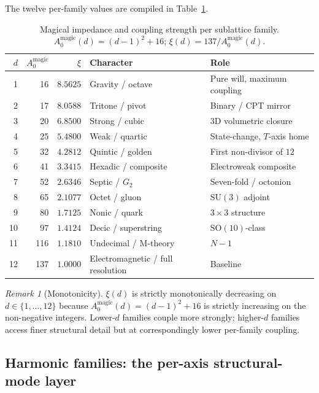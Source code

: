 \documentclass[11pt,a4paper]{article}
\theoremstyle{definition}
\theoremstyle{remark}
\newtheorem{remark}[theorem]{Remark}
\begin{document}
The twelve per-family values are compiled in Table~\ref{tab:impedance}.
\begin{table}[h]
\centering
\caption{Magical impedance and coupling strength per sublattice family. $A_{0}^{\text{magic}}(d) = (d-1)^{2} + 16$; $\xi(d) = 137/A_{0}^{\text{magic}}(d)$.}
\label{tab:impedance}
\begin{tabular}{@{}rrrll@{}}
\toprule
$d$ & $A_{0}^{\text{magic}}$ & $\xi$ & Character & Role \\
\midrule
 1 &  16 & $8.5625$ & Gravity / octave                & Pure will, maximum coupling \\
 2 &  17 & $8.0588$ & Tritone / pivot                 & Binary / CPT mirror \\
 3 &  20 & $6.8500$ & Strong / cubic                  & $3$D volumetric closure \\
 4 &  25 & $5.4800$ & Weak / quartic                  & State-change, $T$-axis home \\
 5 &  32 & $4.2812$ & Quintic / golden                & First non-divisor of $12$ \\
 6 &  41 & $3.3415$ & Hexadic / composite             & Electroweak composite \\
 7 &  52 & $2.6346$ & Septic / $G_{2}$                & Seven-fold / octonion \\
 8 &  65 & $2.1077$ & Octet / gluon                   & $\mathrm{SU}(3)$ adjoint \\
 9 &  80 & $1.7125$ & Nonic / quark                   & $3 \times 3$ structure \\
10 &  97 & $1.4124$ & Decic / superstring             & $\mathrm{SO}(10)$-class \\
11 & 116 & $1.1810$ & Undecimal / M-theory            & $N{-}1$ \\
12 & 137 & $1.0000$ & Electromagnetic / full resolution & Baseline \\
\bottomrule
\end{tabular}
\end{table}

\begin{remark}[Monotonicity]
$\xi(d)$ is strictly monotonically decreasing on $d\in\{1,\ldots,12\}$ because $A_{0}^{\text{magic}}(d) = (d-1)^{2}+16$ is strictly increasing on the non-negative integers. Lower-$d$ families couple more strongly; higher-$d$ families access finer structural detail but at correspondingly lower per-family coupling.
\end{remark}

\subsection{Harmonic families: the per-axis structural-mode layer}\label{subsec:harmonic-families}
\end{document}
